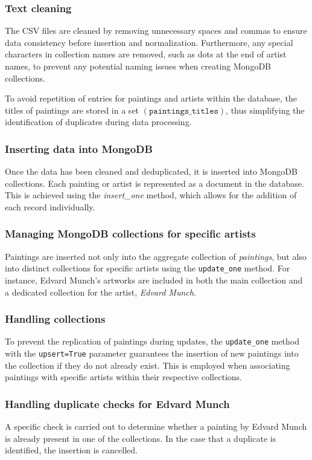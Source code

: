 \documentclass[a4paper,12pt]{article}
\begin{document}
\subsubsection{Text cleaning}
The CSV files are cleaned by removing unnecessary spaces and commas to ensure data consistency before insertion and normalization. Furthermore, any special characters in collection names are removed, such as dots at the end of artist names, to prevent any potential naming issues when creating MongoDB collections.

To avoid repetition of entries for paintings and artists within the database, the titles of paintings are stored in a set $\left(\texttt{paintings\_titles}\right)$, thus simplifying the identification of duplicates during data processing.

\subsubsection{Inserting data into MongoDB}
Once the data has been cleaned and deduplicated, it is inserted into MongoDB collections. Each painting or artist is represented as a document in the database. This is achieved using the \textit{insert\_one} method, which allows for the addition of each record individually.

\subsubsection{Managing MongoDB collections for specific artists}
Paintings are inserted not only into the aggregate collection of \textit{paintings}, but also into distinct collections for specific artists using the \texttt{update\_one} method. For instance, Edvard Munch's artworks are included in both the main collection and a dedicated collection for the artist, \textit{Edvard Munch}.

\subsubsection{Handling collections}
To prevent the replication of paintings during updates, the \texttt{update\_one} method with the \texttt{upsert=True} parameter guarantees the insertion of new paintings into the collection if they do not already exist. This is employed when associating paintings with specific artists within their respective collections.

\subsubsection{Handling duplicate checks for Edvard Munch}
A specific check is carried out to determine whether a painting by Edvard Munch is already present in one of the collections. In the case that a duplicate is identified, the insertion is cancelled.
\end{document}
